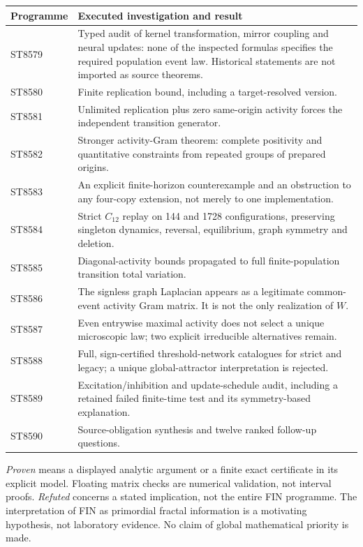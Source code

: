 \documentclass[11pt,a4paper]{article}
\begin{document}
\begin{longtable}{@{}p{}p{}@{}}
\toprule Programme & Executed investigation and result\\\midrule\endhead
ST8579 & Typed audit of kernel transformation, mirror coupling and neural
updates: none of the inspected formulas specifies the required population
event law. Historical statements are not imported as source theorems.\\[1mm]
ST8580 & Finite replication bound, including a target-resolved version.\\[1mm]
ST8581 & Unlimited replication plus zero same-origin activity forces the
independent transition generator.\\[1mm]
ST8582 & Stronger activity-Gram theorem: complete positivity and quantitative
constraints from repeated groups of prepared origins.\\[1mm]
ST8583 & An explicit finite-horizon counterexample and an obstruction to any
four-copy extension, not merely to one implementation.\\[1mm]
ST8584 & Strict $C_{12}$ replay on 144 and 1728 configurations, preserving
singleton dynamics, reversal, equilibrium, graph symmetry and deletion.\\[1mm]
ST8585 & Diagonal-activity bounds propagated to full finite-population
transition total variation.\\[1mm]
ST8586 & The signless graph Laplacian appears as a legitimate common-event
activity Gram matrix. It is not the only realization of $W$.\\[1mm]
ST8587 & Even entrywise maximal activity does not select a unique microscopic
law; two explicit irreducible alternatives remain.\\[1mm]
ST8588 & Full, sign-certified threshold-network catalogues for strict and
legacy; a unique global-attractor interpretation is rejected.\\[1mm]
ST8589 & Excitation/inhibition and update-schedule audit, including a retained
failed finite-time test and its symmetry-based explanation.\\[1mm]
ST8590 & Source-obligation synthesis and twelve ranked follow-up questions.\\
\bottomrule
\end{longtable}

\emph{Proven} means a displayed analytic argument or a finite exact
certificate in its explicit model. Floating matrix checks are numerical
validation, not interval proofs. \emph{Refuted} concerns a stated
implication, not the entire FIN programme. The interpretation of FIN as
primordial fractal information is a motivating hypothesis, not laboratory
evidence. No claim of global mathematical priority is made.
\end{document}
